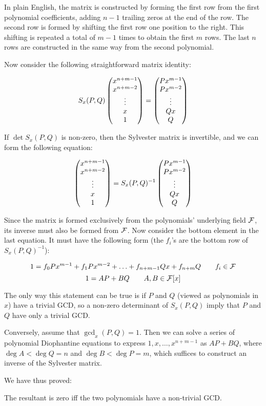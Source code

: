In plain English, the matrix is constructed by forming the first row
from the first polynomial coefficients, adding $n-1$ trailing zeros at
the end of the row.  The second row is formed by shifting the first
row one position to the right.  This shifting is repeated a total of
$m-1$ times to obtain the first $m$ rows.  The last $n$ rows are
constructed in the same way from the second polynomial.

Now consider the following straightforward matrix identity:

$$ S_x(P,Q) \begin{pmatrix}x^{n+m-1}\cr x^{n+m-2}\cr \vdots \cr x \cr 1\end{pmatrix}
 = \begin{pmatrix}P x^{m-1}\cr P x^{m-2}\cr \vdots \cr Q x \cr Q\end{pmatrix} $$

If $\det S_x(P,Q)$ is non-zero, then the Sylvester matrix is
invertible, and we can form the following equation:

$$ \begin{pmatrix}x^{n+m-1}\cr x^{n+m-2}\cr \vdots \cr x \cr 1\end{pmatrix}
 = S_x(P,Q)^{-1} \begin{pmatrix}P x^{m-1}\cr P x^{m-2}\cr \vdots \cr Q x \cr Q\end{pmatrix} $$

Since the matrix is formed exclusively from the polynomials'
underlying field ${\cal F}$, its inverse must also be formed from
${\cal F}$.  Now consider the bottom element in the last equation.  It
must have the following form (the $f_i$'s are the bottom row of
$S_x(P,Q)^{-1}$):

$$ 1 = f_0 P x^{m-1} + f_1 P x^{m-2} + \ldots + f_{n+m-1} Q x + f_{n+m} Q \qquad f_i \in {\cal F}$$
$$ 1 = A P + B Q \qquad A,B \in {\cal F}[x] $$

The only way this statement can be true is if $P$ and $Q$ (viewed
as polynomials in $x$) have a
trivial GCD, so a non-zero determinant of $S_x(P,Q)$ imply that $P$ and
$Q$ have only a trivial GCD.

Conversely, assume that $\gcd_x(P,Q) = 1$.  Then we can solve a series
of polynomial Diophantine equations to express $1, x, \ldots,
x^{n+m-1}$ as $AP+BQ$, where $\deg A < \deg Q = n$ and $\deg B <
\deg P = m$, which suffices to construct an inverse of the Sylvester
matrix.

We have thus proved:

\begin{theorem}\label{resultant theorem}
The resultant is zero iff the two polynomials have a non-trivial GCD.
\end{theorem}

